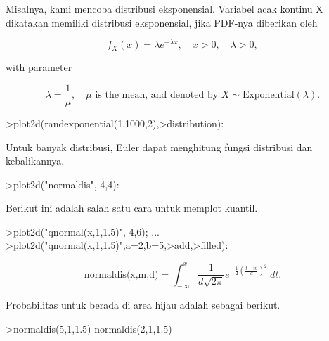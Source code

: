 \documentclass[a4paper,10pt]{article}
\begin{document}
\begin{eulernotebook}
\begin{eulercomment}
Misalnya, kami mencoba distribusi eksponensial. Variabel acak kontinu
X dikatakan memiliki distribusi eksponensial, jika PDF-nya diberikan
oleh

\end{eulercomment}
\begin{eulerformula}
\[
f_X(x)=\lambda e^{-\lambda x},\quad x>0,\quad \lambda>0,
\]
\end{eulerformula}
\begin{eulercomment}
with parameter\\
\end{eulercomment}
\begin{eulerformula}
\[
\lambda=\frac{1}{\mu},\quad \mu \text{ is the mean, and denoted by } X \sim \text{Exponential}(\lambda).
\]
\end{eulerformula}
\begin{eulerprompt}
>plot2d(randexponential(1,1000,2),>distribution):
\end{eulerprompt}
\begin{eulercomment}
Untuk banyak distribusi, Euler dapat menghitung fungsi distribusi dan
kebalikannya.
\end{eulercomment}
\begin{eulerprompt}
>plot2d("normaldis",-4,4): 
\end{eulerprompt}
\begin{eulercomment}
Berikut ini adalah salah satu cara untuk memplot kuantil.
\end{eulercomment}
\begin{eulerprompt}
>plot2d("qnormal(x,1,1.5)",-4,6);  ...
>plot2d("qnormal(x,1,1.5)",a=2,b=5,>add,>filled):
\end{eulerprompt}
\begin{eulerformula}
\[
\text{normaldis(x,m,d)}=\int_{-\infty}^x \frac{1}{d\sqrt{2\pi}}e^{-\frac{1}{2}(\frac{t-m}{d})^2}\ dt.
\]
\end{eulerformula}
\begin{eulercomment}
Probabilitas untuk berada di area hijau adalah sebagai berikut.
\end{eulercomment}
\begin{eulerprompt}
>normaldis(5,1,1.5)-normaldis(2,1,1.5)
\end{eulerprompt}
\begin{euleroutput}

\end{euleroutput}
\end{eulernotebook}
\end{document}
